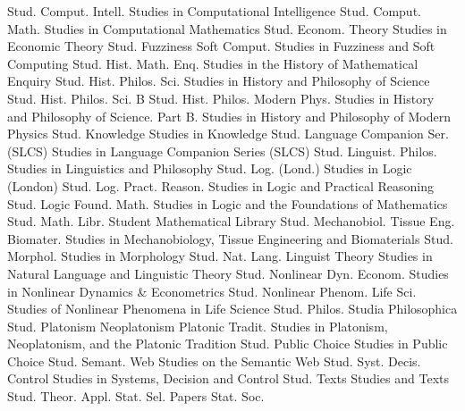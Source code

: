 {Stud. Comput. Intell.}
{Studies in Computational Intelligence}
{Stud. Comput. Math.}
{Studies in Computational Mathematics}
{Stud. Econom. Theory}
{Studies in Economic Theory}
{Stud. Fuzziness Soft Comput.}
{Studies in Fuzziness and Soft Computing}
{Stud. Hist. Math. Enq.}
{Studies in the History of Mathematical Enquiry}
{Stud. Hist. Philos. Sci.}
{Studies in History and Philosophy of Science}
{Stud. Hist. Philos. Sci. B Stud. Hist. Philos. Modern Phys.}
{Studies in History and Philosophy of Science. Part B. Studies in History and Philosophy of Modern Physics}
{Stud. Knowledge}
{Studies in Knowledge}
{Stud. Language Companion Ser. (SLCS)}
{Studies in Language Companion Series (SLCS)}
{Stud. Linguist. Philos.}
{Studies in Linguistics and Philosophy}
{Stud. Log. (Lond.)}
{Studies in Logic (London)}
{Stud. Log. Pract. Reason.}
{Studies in Logic and Practical Reasoning}
{Stud. Logic Found. Math.}
{Studies in Logic and the Foundations of Mathematics}
{Stud. Math. Libr.}
{Student Mathematical Library}
{Stud. Mechanobiol. Tissue Eng. Biomater.}
{Studies in Mechanobiology, Tissue Engineering and Biomaterials}
{Stud. Morphol.}
{Studies in Morphology}
{Stud. Nat. Lang. Linguist Theory}
{Studies in Natural Language and Linguistic Theory}
{Stud. Nonlinear Dyn. Econom.}
{Studies in Nonlinear Dynamics & Econometrics}
{Stud. Nonlinear Phenom. Life Sci.}
{Studies of Nonlinear Phenomena in Life Science}
{Stud. Philos.}
{Studia Philosophica}
{Stud. Platonism Neoplatonism Platonic Tradit.}
{Studies in Platonism, Neoplatonism, and the Platonic Tradition}
{Stud. Public Choice}
{Studies in Public Choice}
{Stud. Semant. Web}
{Studies on the Semantic Web}
{Stud. Syst. Decis. Control}
{Studies in Systems, Decision and Control}
{Stud. Texts}
{Studies and Texts}
{Stud. Theor. Appl. Stat. Sel. Papers Stat. Soc.}
